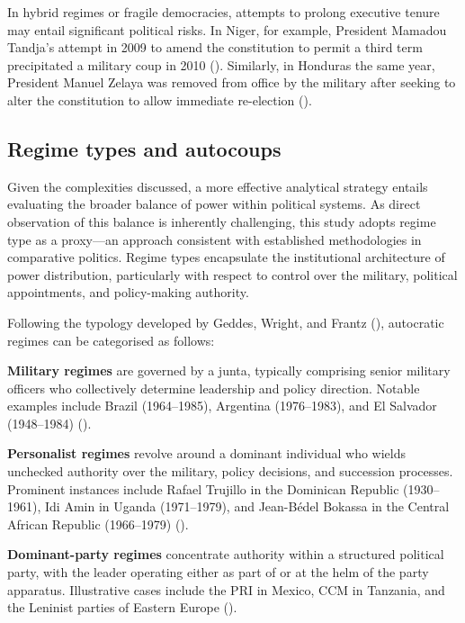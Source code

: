 \documentclass[
  12pt,
]{report}
\begin{document}
In hybrid regimes or fragile democracies, attempts to prolong executive
tenure may entail significant political risks. In Niger, for example,
President Mamadou Tandja's attempt in 2009 to amend the constitution to
permit a third term precipitated a military coup in 2010
(). Similarly, in Honduras the
same year, President Manuel Zelaya was removed from office by the
military after seeking to alter the constitution to allow immediate
re-election ().

\subsection*{Regime types and
autocoups}\label{regime-types-and-autocoups}

Given the complexities discussed, a more effective analytical strategy
entails evaluating the broader balance of power within political
systems. As direct observation of this balance is inherently
challenging, this study adopts regime type as a proxy---an approach
consistent with established methodologies in comparative politics.
Regime types encapsulate the institutional architecture of power
distribution, particularly with respect to control over the military,
political appointments, and policy-making authority.

Following the typology developed by Geddes, Wright, and Frantz
(), autocratic regimes can be categorised
as follows:

\textbf{Military regimes} are governed by a junta, typically comprising
senior military officers who collectively determine leadership and
policy direction. Notable examples include Brazil (1964--1985),
Argentina (1976--1983), and El Salvador (1948--1984)
().

\textbf{Personalist regimes} revolve around a dominant individual who
wields unchecked authority over the military, policy decisions, and
succession processes. Prominent instances include Rafael Trujillo in the
Dominican Republic (1930--1961), Idi Amin in Uganda (1971--1979), and
Jean-Bédel Bokassa in the Central African Republic (1966--1979)
().

\textbf{Dominant-party regimes} concentrate authority within a
structured political party, with the leader operating either as part of
or at the helm of the party apparatus. Illustrative cases include the
PRI in Mexico, CCM in Tanzania, and the Leninist parties of Eastern
Europe ().
\end{document}
